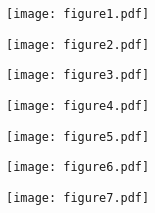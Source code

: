   \FloatBarrier
  \newpage

  \begin{figure}[H]
    \centering
    \texttt{[image: figure1.pdf]}
  \end{figure}


  \FloatBarrier
  \newpage

  \begin{figure}[H]
    \centering
    \texttt{[image: figure2.pdf]}
  \end{figure}

  \FloatBarrier
  \newpage

  \begin{figure}[H]
    \centering
    \texttt{[image: figure3.pdf]}
  \end{figure}

  \FloatBarrier
  \newpage

  \begin{figure}[H]
    \centering
    \texttt{[image: figure4.pdf]}
  \end{figure}

  \FloatBarrier
  \newpage

  \begin{figure}[H]
    \centering
    \texttt{[image: figure5.pdf]}
  \end{figure}

  \FloatBarrier
  \newpage

  \begin{figure}[H]
    \centering
    \texttt{[image: figure6.pdf]}
  \end{figure}

  \FloatBarrier
  \newpage

  \begin{figure}[H]
    \centering
    \texttt{[image: figure7.pdf]}
  \end{figure}

